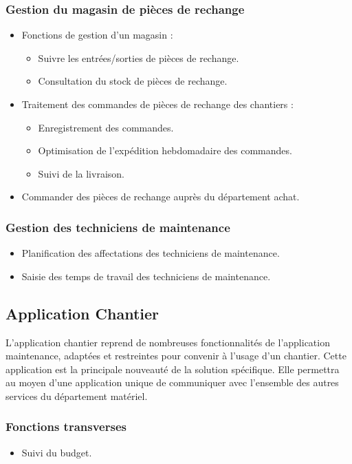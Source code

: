 \subsubsection{Gestion du magasin de pièces de rechange}
\begin{itemize}
\item Fonctions de gestion d'un magasin :
    \begin{itemize}
    \item Suivre les entrées/sorties de pièces de rechange.
    \item Consultation du stock de pièces de rechange.
    \end{itemize}
\item Traitement des commandes de pièces de rechange des chantiers :
    \begin{itemize}
    \item Enregistrement des commandes.
    \item Optimisation de l'expédition hebdomadaire des commandes.
    \item Suivi de la livraison.
    \end{itemize}
\item Commander des pièces de rechange auprès du département achat.
\end{itemize}

\subsubsection{Gestion des techniciens de maintenance}
\begin{itemize}
\item Planification des affectations des techniciens de maintenance.
\item Saisie des temps de travail des techniciens de maintenance.
\end{itemize}


\subsection{Application Chantier}
L'application chantier reprend de nombreuses fonctionnalités de
l'application maintenance, adaptées et restreintes pour convenir à l'usage
d'un chantier. 
Cette application est la principale nouveauté de la solution 
spécifique. Elle permettra au moyen d'une application unique de communiquer
avec l'ensemble des autres services du département matériel.


\subsubsection{Fonctions transverses}
\begin{itemize}
\item Suivi du budget.
\end{itemize}

